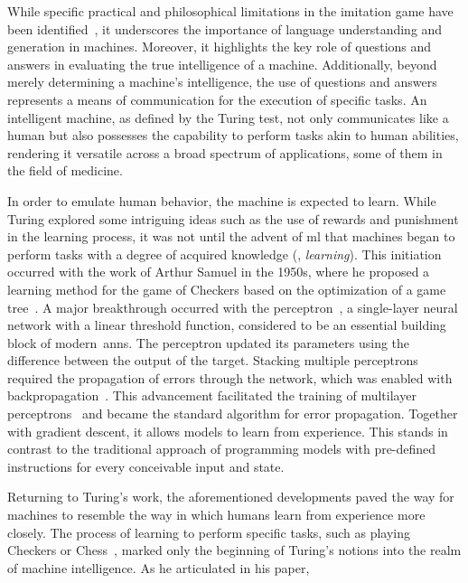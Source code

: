 While specific practical and philosophical limitations in the imitation game have been identified~\cite{turing2009computing,french1990subcognition}, it underscores the importance of language understanding and generation in machines. Moreover, it highlights the key role of questions and answers in evaluating the true intelligence of a machine. Additionally, beyond merely determining a machine's intelligence, the use of questions and answers represents a means of communication for the execution of specific tasks. An intelligent machine, as defined by the Turing test, not only communicates like a human but also possesses the capability to perform tasks akin to human abilities, rendering it versatile across a broad spectrum of applications, some of them in the field of medicine.

In order to emulate human behavior, the machine is expected to learn. While Turing explored some intriguing ideas such as the use of rewards and punishment in the learning process, it was not until the advent of \gls{ml} that machines began to perform tasks with a degree of acquired knowledge (\ie, \textit{learning}). This initiation occurred with the work of Arthur Samuel in the 1950s, where he proposed a learning method for the game of Checkers based on the optimization of a game tree~\cite{samuel1959some}. A major breakthrough occurred with the perceptron~\cite{rosenblatt1958perceptron}, a single-layer neural network with a linear threshold function, considered to be an essential building block of modern~\glspl{ann}. The perceptron updated its parameters using the difference between the output of the target. Stacking multiple perceptrons required the propagation of errors through the network, which was enabled with backpropagation~\cite{linnainmaa1970representation}. This advancement facilitated the training of multilayer perceptrons~\cite{werbos2005applications,rumelhart1986learning} and became the standard algorithm for error propagation. Together with gradient descent, it allows models to learn from experience. This stands in contrast to the traditional approach of programming models with pre-defined instructions for every conceivable input and state. 





Returning to Turing's work, the aforementioned developments paved the way for machines to resemble the way in which humans learn from experience more closely. The process of learning to perform specific tasks, such as playing Checkers or Chess~\cite{hsu1999ibm}, marked only the beginning of Turing's notions into the realm of machine intelligence. As he articulated in his paper,

